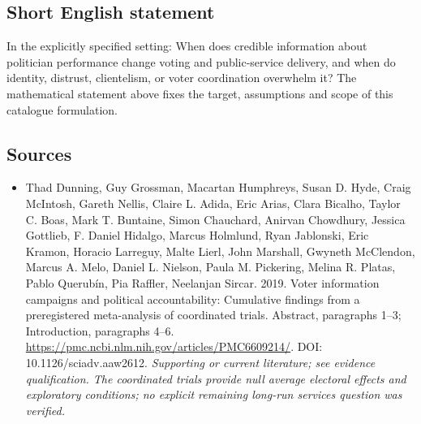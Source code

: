 \documentclass[11pt]{article}
\begin{document}
\subsection{Short English statement}
In the explicitly specified setting: When does credible information about politician performance change voting and public-service delivery, and when do identity, distrust, clientelism, or voter coordination overwhelm it? The mathematical statement above fixes the target, assumptions and scope of this catalogue formulation.

\subsection{Sources}
\begin{itemize}\raggedright
\item[\textnormal{[S1]}]\hypertarget{source:30007669:1}{} Thad Dunning, Guy Grossman, Macartan Humphreys, Susan D. Hyde, Craig McIntosh, Gareth Nellis, Claire L. Adida, Eric Arias, Clara Bicalho, Taylor C. Boas, Mark T. Buntaine, Simon Chauchard, Anirvan Chowdhury, Jessica Gottlieb, F. Daniel Hidalgo, Marcus Holmlund, Ryan Jablonski, Eric Kramon, Horacio Larreguy, Malte Lierl, John Marshall, Gwyneth McClendon, Marcus A. Melo, Daniel L. Nielson, Paula M. Pickering, Melina R. Platas, Pablo Querubín, Pia Raffler, Neelanjan Sircar. 2019. Voter information campaigns and political accountability: Cumulative findings from a preregistered meta-analysis of coordinated trials. Abstract, paragraphs 1–3; Introduction, paragraphs 4–6.
\url{https://pmc.ncbi.nlm.nih.gov/articles/PMC6609214/}.
DOI: 10.1126/sciadv.aaw2612.
{\small\textit{Supporting or current literature; see evidence qualification. The coordinated trials provide null average electoral effects and exploratory conditions; no explicit remaining long-run services question was verified.}}
\end{itemize}
\end{document}
